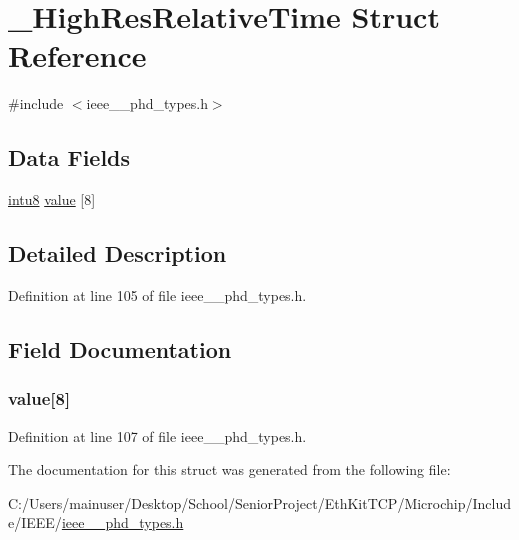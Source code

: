 \hypertarget{struct___high_res_relative_time}{}\section{\+\_\+\+High\+Res\+Relative\+Time Struct Reference}
\label{struct___high_res_relative_time}


{\ttfamily \#include $<$ieee\+\_\+\_\+phd\+\_\+types.\+h$>$}

\subsection*{Data Fields}
\begin{DoxyCompactItemize}
\item 
\hyperlink{ieee__11073__phd__types_8h_ae21d5428a584a153613cbe335630d3f4}{intu8} \hyperlink{struct___high_res_relative_time_a36ace4c780db2a265df95ac37f635586}{value} \mbox{[}8\mbox{]}
\end{DoxyCompactItemize}


\subsection{Detailed Description}


Definition at line 105 of file ieee\+\_\+\_\+phd\+\_\+types.\+h.



\subsection{Field Documentation}
\hypertarget{struct___high_res_relative_time_a36ace4c780db2a265df95ac37f635586}{}
\subsubsection[{value}]{ value\mbox{[}8\mbox{]}}\label{struct___high_res_relative_time_a36ace4c780db2a265df95ac37f635586}


Definition at line 107 of file ieee\+\_\+\_\+phd\+\_\+types.\+h.



The documentation for this struct was generated from the following file\+:\begin{DoxyCompactItemize}
\item 
C\+:/\+Users/mainuser/\+Desktop/\+School/\+Senior\+Project/\+Eth\+Kit\+T\+C\+P/\+Microchip/\+Include/\+I\+E\+E\+E/\hyperlink{ieee__11073__phd__types_8h}{ieee\+\_\+\_\+phd\+\_\+types.\+h}\end{DoxyCompactItemize}
